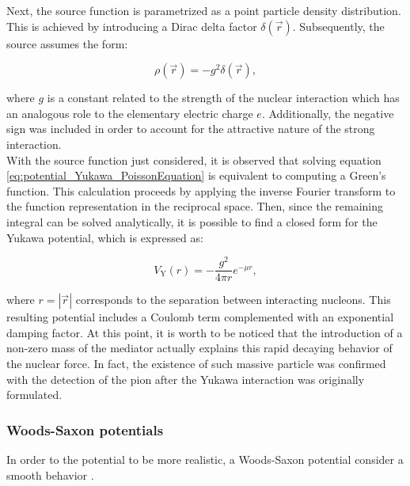 \documentclass[openany]{book}
\begin{document}
Next, the source function is parametrized as a point particle density distribution. This is achieved by introducing a Dirac delta factor $\delta(\vec r)$. Subsequently, the source assumes the form: 

\begin{equation} \label{eq:potential_Yukawa_pointDistribution}
	\rho(\vec r) = -g^2 \delta(\vec r),
\end{equation}

where $g$ is a constant related to the strength of the nuclear interaction which has an analogous role to the elementary electric charge $e$. Additionally, the negative sign was included in order to account for the attractive nature of the strong interaction.  \\


With the source function just considered, it is observed that solving equation \ref{eq:potential_Yukawa_PoissonEquation} is equivalent to computing a Green's function. This calculation proceeds by applying the inverse Fourier transform to the function representation in the reciprocal space. Then, since the remaining integral can be solved analytically, it is possible to find a closed form for the Yukawa potential, which is expressed as:
 
\begin{equation} \label{eq:potential_Yukawa}
	V_{\mathrm{Y}}(r) = -\frac{g^2}{4\pi r}e^{-\mu r},
\end{equation}

where $r = |\vec r|$ corresponds to the separation between interacting nucleons. This resulting potential includes a Coulomb term complemented with an exponential damping factor. At this point, it is worth to be noticed that the introduction of a non-zero mass of the mediator actually explains this rapid decaying behavior of the nuclear force. In fact, the existence of such massive particle was confirmed with the detection of the pion after the Yukawa interaction was originally formulated.



\subsubsection{Woods-Saxon potentials} \label{sub:potential_effective_woodsSaxon}

In order to the potential to be more realistic, a Woods-Saxon potential consider a smooth behavior \cite{singh_sukhvinder_kharab_2013A}.
\end{document}
